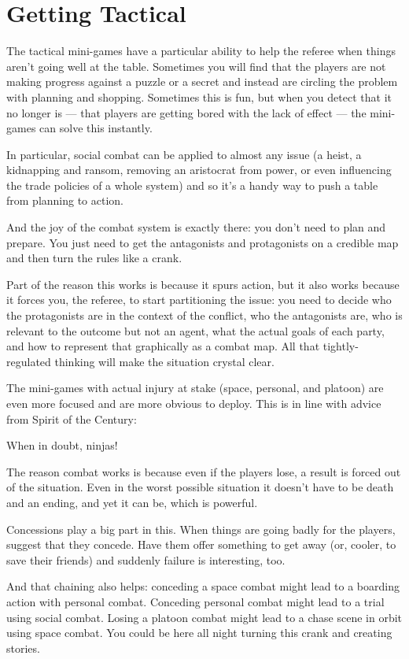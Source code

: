 \section{Getting Tactical}
\label{sec:getting-tactical}

The tactical mini-games have a particular ability to help the referee when things aren't going well at the table. Sometimes you will find that the players are not making progress against a puzzle or a secret and instead are circling the problem with planning and shopping. Sometimes this is fun, but when you detect that it no longer is --- that players are getting bored with the lack of effect --- the mini-games can solve this instantly.

In particular, social combat can be applied to almost any issue (a heist, a kidnapping and ransom, removing an aristocrat from power, or even influencing the trade policies of a whole system) and so it's a handy way to push a table from planning to action.

And the joy of the combat system is exactly there: you don't need to plan and prepare. You just need to get the antagonists and protagonists on a credible map and then turn the rules like a crank.

Part of the reason this works is because it spurs action, but it also works because it forces you, the referee, to start partitioning the issue: you need to decide who the protagonists are in the context of the conflict, who the antagonists are, who is relevant to the outcome but not an agent, what the actual goals of each party, and how to represent that graphically as a combat map. All that tightly-regulated thinking will make the situation crystal clear.

The mini-games with actual injury at stake (space, personal, and platoon) are even more focused and are more obvious to deploy. This is in line with advice from Spirit of the Century:

When in doubt, ninjas!

The reason combat works is because even if the players lose, a result is forced out of the situation. Even in the worst possible situation it doesn't have to be death and an ending, and yet it can be, which is powerful.

Concessions play a big part in this. When things are going badly for the players, suggest that they concede. Have them offer something to get away (or, cooler, to save their friends) and suddenly failure is interesting, too.


And that chaining also helps: conceding a space combat might lead to a boarding action with personal combat. Conceding personal combat might lead to a trial using social combat. Losing a platoon combat might lead to a chase scene in orbit using space combat. You could be here all night turning this crank and creating stories.

